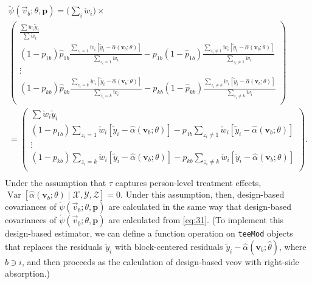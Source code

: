 \documentclass{article}
\newcommand{\owt}[1][{[z_{i}]}]{\ensuremath{\check{w}_{i#1}}}
\begin{document}
\begin{multline*}
    \breve{\psi}(\vec{v}_{b}; \theta, \mathbf{p}) = \Big(\sum_{i} \owt[]\Big) \times\\
        \left(
          \begin{array}{c}
            \frac{\sum \owt[] \tilde{y}_{i}}{\sum \owt[]} \\
         {} (1-{p}_{1b})
            \hat{p}_{1b}\frac{\sum_{{z_i=1}}\owt[][\tilde{y}_{i} -
    \hat{\alpha}(\mathbf{v}_{b}; \theta)]}{\sum_{{z_i=1}}\owt[]}  -
      p_{1b}(1-\hat{p}_{1b})\frac{\sum_{{z_i\neq
            1}}\owt[][\tilde{y}_{i} -
    \hat{\alpha}(\mathbf{v}_{b}; \theta)]}{\sum_{{z_i\neq 1}}\owt[]}\\
      \vdots\\
         {}
            (1-{p}_{kb})\hat{p}_{kb}\frac{\sum_{{z_i=k}}\owt[][\tilde{y}_{i} -
    \hat{\alpha}(\mathbf{v}_{b}; \theta)]}{\sum_{{z_i=k}}\owt[]}  -
      p_{kb}(1-\hat{p}_{kb})\frac{\sum_{{z_i\neq
            k}}\owt[][\tilde{y}_{i} -
    \hat{\alpha}(\mathbf{v}_{b}; \theta)]}{\sum_{{z_i\neq k}}\owt[]} \\
          \end{array}
        \right)\\
= 
        \left(
          \begin{array}{c}
            \sum \owt[] \tilde{y}_{i}\\
         {} (1-{p}_{1b})
            {\sum_{{z_i=1}}\owt[][\tilde{y}_{i} -
    \hat{\alpha}(\mathbf{v}_{b}; \theta)]}  -
      p_{1b}{\sum_{{z_i\neq
            1}}\owt[][\tilde{y}_{i} -
    \hat{\alpha}(\mathbf{v}_{b}; \theta)]}\\
      \vdots\\
         {}
            (1-{p}_{kb}){\sum_{{z_i=k}}\owt[][\tilde{y}_{i} -
    \hat{\alpha}(\mathbf{v}_{b}; \theta)]}  -
      p_{kb}{\sum_{{z_i\neq
            k}}\owt[][\tilde{y}_{i} -
    \hat{\alpha}(\mathbf{v}_{b}; \theta)]} \\
          \end{array}
        \right).\\
\end{multline*}
Under the assumption that $\tau$ captures person-level treatment
effects, $\operatorname{Var}[ \hat{\alpha}(\mathbf{v}_{b}; \theta) \mid \mathcal{X}, \mathcal{Y}, 
\mathcal{Z}]=0$. Under this assumption, then, design-based covariances
of $\breve{\psi}(\vec{v}_{b}; \theta, \mathbf{p})$ are calculated in
the same way that design-based covariances of
$\acute{\psi}(\vec{v}_{b}; \theta, \mathbf{p})$ are calculated from
\eqref{eq:31}.  (To implement this design-based estimator, we can
define a function operation on \texttt{teeMod} objects that replaces
the residuals $\tilde{y}_{i}$ with block-centered residuals  $\tilde{y}_{i} -
\hat{\alpha}(\mathbf{v}_{b}; \hat\theta)$, where $b \ni i$, and then
proceeds as the calculation of design-based vcov with right-side absorption.)
\end{document}
